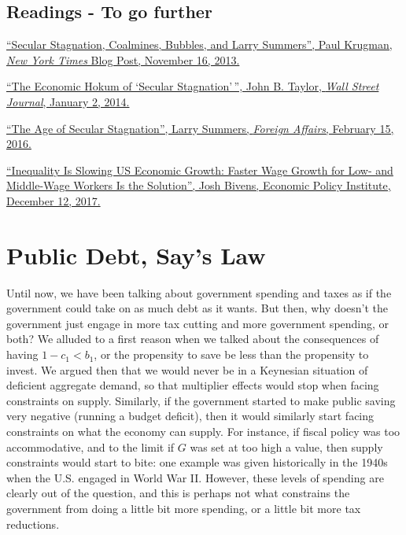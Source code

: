 \documentclass[]{book}
\begin{document}
\section*{Readings - To go further}\label{readings---to-go-further-8}

\href{https://krugman.blogs.nytimes.com/2013/11/16/secular-stagnation-coalmines-bubbles-and-larry-summers/}{``Secular
Stagnation, Coalmines, Bubbles, and Larry Summers'', Paul Krugman,
\emph{New York Times} Blog Post, November 16, 2013.}

\href{https://search.proquest.com/docview/1473347330/6C9B371C00BE4C7BPQ/1?accountid=14512}{``The
Economic Hokum of `Secular Stagnation'\,'', John B. Taylor, \emph{Wall
Street Journal}, January 2, 2014.}

\href{http://larrysummers.com/2016/02/17/the-age-of-secular-stagnation/}{``The
Age of Secular Stagnation'', Larry Summers, \emph{Foreign Affairs},
February 15, 2016.}

\href{https://www.epi.org/publication/secular-stagnation/}{``Inequality
Is Slowing US Economic Growth: Faster Wage Growth for Low- and
Middle-Wage Workers Is the Solution'', Josh Bivens, Economic Policy
Institute, December 12, 2017.}

\hypertarget{public-debt}{\chapter{Public Debt, Say's
Law}\label{public-debt}}

Until now, we have been talking about government spending and taxes as
if the government could take on as much debt as it wants. But then, why
doesn't the government just engage in more tax cutting and more
government spending, or both? We alluded to a first reason when we
talked about the consequences of having \(1-c_1<b_1\), or the propensity
to save be less than the propensity to invest. We argued then that we
would never be in a Keynesian situation of deficient aggregate demand,
so that multiplier effects would stop when facing constraints on supply.
Similarly, if the government started to make public saving very negative
(running a budget deficit), then it would similarly start facing
constraints on what the economy can supply. For instance, if fiscal
policy was too accommodative, and to the limit if \(G\) was set at too
high a value, then supply constraints would start to bite: one example
was given historically in the 1940s when the U.S. engaged in World War
II. However, these levels of spending are clearly out of the question,
and this is perhaps not what constrains the government from doing a
little bit more spending, or a little bit more tax reductions.
\end{document}
